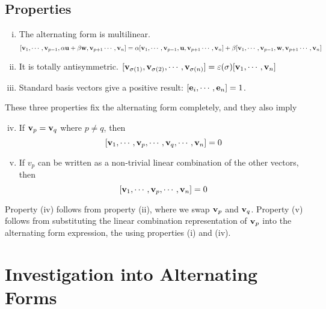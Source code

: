 \documentclass{article}
\begin{document}
\subsection{Properties}
\begin{enumerate}[(i)]
	\item The alternating form is multilinear.
	      \[ [ \vb v_1, \cdots, \vb v_{p-1}, \alpha \vb u + \beta \vb w, \vb v_{p+1} \cdots, \vb v_n ] = \alpha [ \vb v_1, \cdots, \vb v_{p-1}, \vb u, \vb v_{p+1} \cdots, \vb v_n ] + \beta [ \vb v_1, \cdots, \vb v_{p-1}, \vb w, \vb v_{p+1} \cdots, \vb v_n ] \]
	\item It is totally antisymmetric. $[ \vb v_{\sigma(1)}, \vb v_{\sigma(2)}, \cdots, \vb v_{\sigma(n)} ] = \varepsilon(\sigma) [ \vb v_1, \cdots, \vb v_n ]$
	\item Standard basis vectors give a positive result: $[\vb e_i, \cdots, \vb e_n] = 1$.
\end{enumerate}
These three properties fix the alternating form completely, and they also imply
\begin{enumerate}[(i)]
	\setcounter{enumi}{3}
	\item If $\vb v_p = \vb v_q$ where $p \neq q$, then
	      \[ [\vb v_1, \cdots, \vb v_p, \cdots, \vb v_q, \cdots, \vb v_n ] = 0 \]
	\item If $v_p$ can be written as a non-trivial linear combination of the other vectors, then
	      \[ [\vb v_1, \cdots, \vb v_p, \cdots, \vb v_n ] = 0 \]
\end{enumerate}
Property (iv) follows from property (ii), where we swap $\vb v_p$ and $\vb v_q$. Property (v) follows from substituting the linear combination representation of $\vb v_p$ into the alternating form expression, the using properties (i) and (iv).

\section{Investigation into Alternating Forms}
\end{document}
